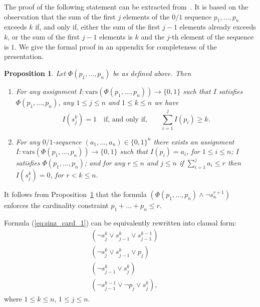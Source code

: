 \documentclass{article} \usepackage[utf8]{inputenc}
\newcommand*{\csf}{\ensuremath{{s}}}
\newcommand*{\Sinz}{\ensuremath{\Phi}}
\newcommand*{\vars}{\ensuremath{\mathrm{vars}}}
\newtheorem{proposition}[theorem]{Proposition}
\begin{document}
The proof of the following statement can be extracted from~\cite{Sinz05}. 
It is based on the observation that the sum of the first $j$ elements of the $0/1$ sequence
$p_1,\dots, p_n$ exceeds $k$ if, and only if, either the sum of the first 
$j-1$ elements already exceeds $k$, or the sum of the first $j-1$ elements is $k$ and 
the $j$-th element of the sequence is $1$.
We give the formal proof in an appendix for completeness of the presentation.
\begin{proposition}\label{prop:sinz}
Let $\Sinz(p_1,\dots,p_n)$ be as defined above.  Then 
\begin{enumerate}
\item[(i)] For any assignment $I:\vars(\Sinz(p_1,\dots,p_n))\to\{0,1\}$ such that $I$ satisfies $\Sinz(p_1,\dots,p_n)$,
any $1\leq j\leq n$ and $1\leq k\leq n$
we have 
$$
    I(\csf^k_j) = 1\quad \textrm{if, and only if,}\quad \quad\sum_{i=1}^j I(p_i) \geq k.
$$
\item[(ii)] For any $0/1$-sequence  $(a_1,\dots, a_n)\in\{0,1\}^n$ 
 there exists an assignment $I:\vars(\Sinz(p_1,\dots,p_n))\to \{0,1\}$ such that 
  $I(p_i) = a_i$, for $1\leq i \leq n$;
  $I$ satisfies $\Sinz(p_1,\dots,p_n)$; and 
  for any $r\leq n$ and $j\leq n$ if $\sum_{i=1}^j a_i \leq r$ then $I(\csf^k_j) = 0$, for $r<k\leq n$.
\end{enumerate}
\end{proposition}
It follows from Proposition~\ref{prop:sinz} that the formula
$(\Sinz(p_1,\dots,p_n)\land \lnot \csf^{r+1}_n)$ enforces the cardinality
constraint $p_1+\dots+p_n\leq r$. 

Formula (\ref{eq:sinz_card_1}) can be equivalently rewritten into clausal form:
\begin{eqnarray}
\label{eq:equiv_clause_1}(\lnot \csf^k_j \lor \csf^k_{j-1}\lor \csf^{k-1}_{j-1}) & & \\\label{eq:equiv_clause_2}(\lnot \csf^k_j \lor \csf^k_{j-1}\lor p_j) & & \\\label{eq:equiv_clause_3}(\lnot \csf^k_{j-1}\lor \csf^k_j ) & & \\\label{eq:equiv_clause_4}(\lnot \csf^{k-1}_{j-1}\lor \lnot p_j\lor \csf^k_j), & & \end{eqnarray}
{where $1\leq k\leq n$, $1\leq j\leq n$}.

\smallskip
\end{document}
